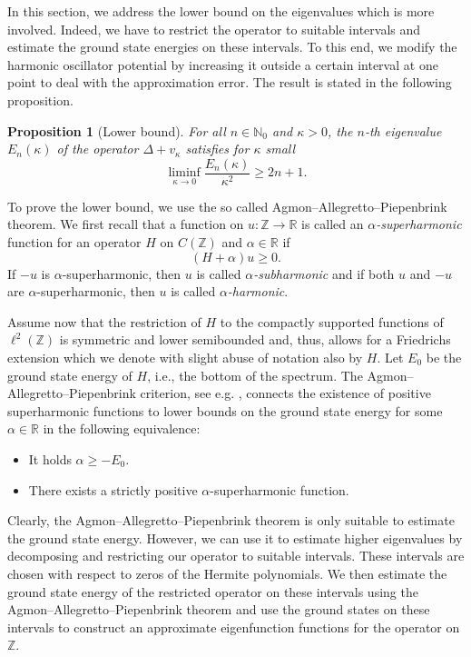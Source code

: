 \documentclass[12pt, reqno]{amsart}
\newtheorem{proposition}[theorem]{Proposition}
\theoremstyle{definition}
\numberwithin{equation}{section}
\newcommand{\Z}{{\mathbb Z}}
\newcommand{\R}{{\mathbb R}}
\begin{document}
In this section, we address the lower bound on the eigenvalues which is more involved. Indeed, we have to restrict the operator to suitable intervals and estimate the ground state energies on these intervals. To this end, we modify the harmonic oscillator potential by increasing it outside a certain interval at one point to deal with the approximation error. The result is stated in the following proposition.


\begin{proposition}[Lower bound]\label{thm:lowerbound}
    For all $n\in \mathbb{N}_0$ and $\kappa>0$, the $n$-th eigenvalue $E_n(\kappa)$ of the operator $\Delta + v_\kappa$ satisfies for  $\kappa$ small 
    $$\liminf_{\kappa\to 0} \frac{E_n(\kappa)}{\kappa^2} \geq   2n+1 .$$
\end{proposition}

To prove the lower bound, we use the so called Agmon--Allegretto--Piepenbrink theorem. We first recall that a function on $u:\Z\to\R$ is called an  \emph{$\alpha$-superharmonic} function for an operator $H$ on $C(\Z)$ and  $\alpha \in \mathbb{R}$ if 
\[
(H + \alpha)u \geq 0.
\] 
If $-u$ is $\alpha$-superharmonic, then $u$ is called \emph{$\alpha$-subharmonic} and if both $u$ and $-u$ are $\alpha$-superharmonic, then $u$ is called \emph{$\alpha$-harmonic}.


Assume now that the restriction of $H$ to the compactly supported functions of $\ell^2(\Z)$ is symmetric and  lower semibounded and, thus, allows for a Friedrichs extension which we denote with slight abuse of notation also by $H$. Let $E_0$ be  the ground state energy of $H$, i.e., the bottom of the spectrum. The Agmon--Allegretto--Piepenbrink criterion, see e.g. \cite[Theorem~4.14]{Keller_Lenz_Wojciechowski_21},  connects the existence of positive superharmonic functions to lower bounds on the ground state energy for some $\alpha\in \R$ in the following equivalence: 
\begin{itemize}
    \item [(i)] It holds $\alpha \geq -E_0$.
    \item [(ii)] There exists a strictly positive $\alpha$-superharmonic function.
\end{itemize}


Clearly, the Agmon--Allegretto--Piepenbrink theorem is only suitable to estimate the ground state energy. However, we can use it to estimate higher eigenvalues by decomposing and restricting our operator to suitable intervals. 
These intervals are chosen with respect to zeros of the Hermite polynomials. We then estimate the ground state energy of the restricted operator on these intervals using the   Agmon--Allegretto--Piepenbrink theorem and use the ground states on these intervals to construct an approximate eigenfunction functions for the operator on $\Z$. 
\end{document}
